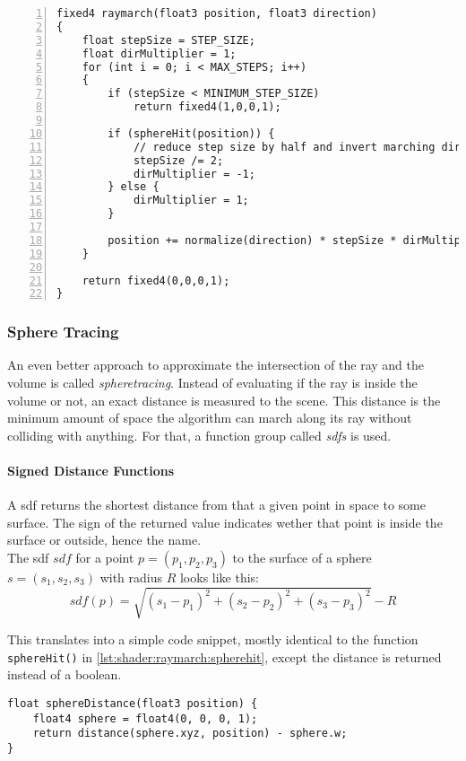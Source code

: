 \begin{lstlisting}[language=HLSL, numbers=left, caption=Traditional ray march function with converging surface distance approximation.,captionpos=b, label=lst:shader:raymarch:traditional]
fixed4 raymarch(float3 position, float3 direction)
{
    float stepSize = STEP_SIZE;
    float dirMultiplier = 1;
    for (int i = 0; i < MAX_STEPS; i++)
    {
        if (stepSize < MINIMUM_STEP_SIZE)
            return fixed4(1,0,0,1);

        if (sphereHit(position)) {
            // reduce step size by half and invert marching direction.
            stepSize /= 2;
            dirMultiplier = -1;
        } else {
            dirMultiplier = 1;
        }
        
        position += normalize(direction) * stepSize * dirMultiplier;
    }
    
    return fixed4(0,0,0,1);
}
\end{lstlisting}

\pagebreak
\subsubsection{Sphere Tracing}
An even better approach to approximate the intersection of the ray and the volume is called \textit{\gls{spheretracing}}. 
Instead of evaluating if the ray is inside the volume or not, an exact distance is measured to the scene. This distance is the minimum amount of space the algorithm can march along its ray without colliding with anything.
For that, a function group called \textit{\gls{sdf}s} is used.

\paragraph{Signed Distance Functions}
A \gls{sdf} returns the shortest distance from that a given point in space to some surface.
The sign of the returned value indicates wether that point is inside the surface or outside, hence the name.
\\
The \gls{sdf} $sdf$ for a point $p=(p_1, p_2, p_3)$ to the surface of a sphere $s=(s_1, s_2, s_3)$ with radius $R$ looks like this:
$$ sdf(p) = \sqrt{(s_1 - p_1)^2 + (s_2 - p_2)^2 + (s_3 - p_3)^2} - R $$

\noindent
This translates into a simple code snippet, mostly identical to the function \lstinline[language=HLSL]{sphereHit()} in \autoref{lst:shader:raymarch:spherehit}, except the distance is returned instead of a boolean.
\begin{lstlisting}[language=HLSL, caption=Implementation of a signed distance function for a sphere., label=lst:shader:raymarch:spheredistance]
float sphereDistance(float3 position) {
    float4 sphere = float4(0, 0, 0, 1);
    return distance(sphere.xyz, position) - sphere.w;
}
\end{lstlisting}

